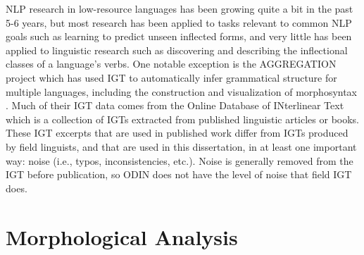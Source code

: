 NLP research in low-resource languages has been growing quite a bit in the past 5-6 years, but most research has been applied to tasks relevant to common NLP goals such as learning to predict unseen inflected forms, and very little has been applied to linguistic research such as discovering and describing the inflectional classes of a language's verbs. One notable exception is the AGGREGATION project \citep{bender_language_2014} which has used IGT to automatically infer grammatical structure for multiple languages, including the construction and visualization of morphosyntax \citep{lepp_visualizing_2019,wax_automated_2014}. Much of their IGT data comes from the Online Database of INterlinear Text \citep[ODIN]{lewis_developing_2010} which is a collection of IGTs extracted from published linguistic articles or books. These IGT excerpts that are used in published work differ from IGTs produced by field linguists, and that are used in this dissertation, in at least one important way: noise (i.e., typos, inconsistencies, etc.). Noise is generally removed from the IGT before publication, so ODIN does not have the level of noise that field IGT does. 

\section{Morphological Analysis}


